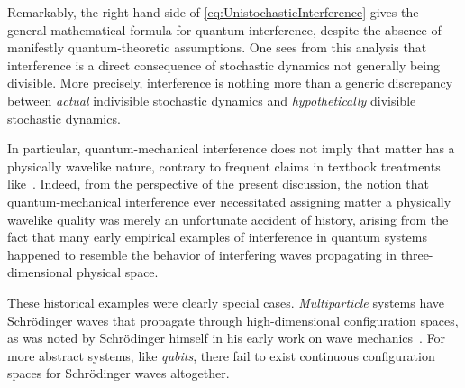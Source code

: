 \documentclass[12pt,english,prl,superscriptaddress,nobibnotes,nofootinbib]{revtex4-2}
\begin{document}
Remarkably, the right-hand side of \eqref{eq:UnistochasticInterference}
gives the general mathematical formula for quantum interference, despite
the absence of manifestly quantum-theoretic assumptions. One sees
from this analysis that interference is a direct consequence of stochastic
dynamics not generally being divisible. More precisely, interference
is nothing more than a generic discrepancy between \emph{actual} indivisible
stochastic dynamics and \emph{hypothetically} divisible stochastic
dynamics. 

In particular, quantum-mechanical interference does not imply that
matter has a physically wavelike nature, contrary to frequent claims
in textbook treatments like~\citep{FeynmanLeightonSands:1965tflopv3}.
Indeed, from the perspective of the present discussion, the notion
that quantum-mechanical interference ever necessitated assigning matter
a physically wavelike quality was merely an unfortunate accident of
history, arising from the fact that many early empirical examples
of interference in quantum systems happened to resemble the behavior
of interfering waves propagating in three-dimensional physical space.

These historical examples were clearly special cases. \emph{Multiparticle}
systems have Schr{\" o}dinger waves that propagate through high-dimensional
configuration spaces, as was noted by Schr{\" o}dinger himself in his early
work on wave mechanics~\citep{Schrodinger:1926autotmoaam}. For more
abstract systems, like \emph{qubits}, there fail to exist continuous
configuration spaces for Schr{\" o}dinger waves altogether.
\end{document}
